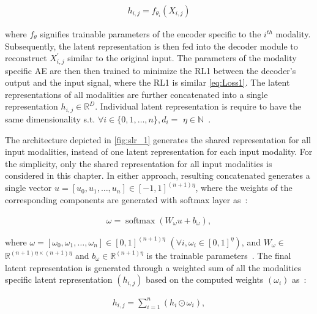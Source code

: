 \vspace{-4mm}
\begin{align}
    h_{i, j}=f_{\theta_{i}}\left({X}_{i, j}\right)
\end{align}

where $f_\theta$ signifies trainable parameters of the encoder specific to the $i^{th}$ modality. Subsequently, the latent representation is then fed into the decoder module to reconstruct ${X}_{i, j}^{\prime}$ similar to the original input. The parameters of the modality specific AE are then then trained to minimize the RL1 between the decoder’s output and the input signal, where the RL1 is similar \cref{eq:Loss1}. The latent representations of all modalities are further concatenated into a single representation $h_{i,j} \in \mathbb{R}^{D}$. Individual latent representation is require to have the same dimensionality s.t. $\forall i \in\{0,1, \ldots, n\}, d_{i}=$ $\eta \in \mathbb{N}$~\cite{mmdcae}. 

\hspace*{3.5mm} The architecture depicted in \cref{fig:slr_1} generates the shared representation for all input modalities, instead of one latent representation for each input modality. For the simplicity, only the shared representation for all input modalities is considered in this chapter. In either approach, resulting concatenated generates a single vector $u=\left[u_{0}, u_{1}, \ldots, u_{n}\right] \in[-1,1]^{(n+1) \eta}$, where the weights of the corresponding components are generated with  softmax layer as~\cite{mmdcae}:

\vspace{-6mm}
\begin{align}
    \omega=\operatorname{softmax}\left(W_{\omega} u+b_{\omega}\right),
\end{align}

\hspace*{3.5mm} where $\omega=\left[\omega_{0}, \omega_{1}, \ldots, \omega_{n}\right] \in[0,1]^{(n+1) \eta}$ $\left(\forall i, \omega_{i} \in[0,1]^{\eta}\right)$, and  $W_{\omega} \in$
$\mathbb{R}^{(n+1) \eta \times(n+1) \eta}$ and $b_{\omega} \in \mathbb{R}^{(n+1) \eta}$ is the trainable parameters~\cite{mmdcae}. The final latent representation is generated through a weighted sum of all the modalities specific latent representation $\left(h_{i,j}\right)$ based on the computed weights $\left(\omega_{i}\right)$ as~\cite{mmdcae}: 

\vspace{-4mm}
\begin{align}
   h_{i,j}=\sum_{i=1}^{n}\left(h_{i} \odot \omega_{i}\right),
\end{align}

